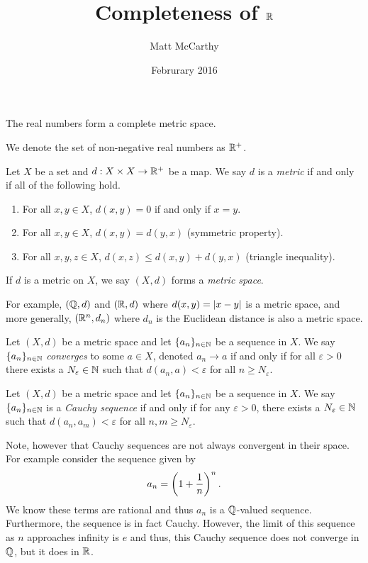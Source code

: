 \documentclass[notitlepage]{simple}
\author{Matt McCarthy}
\title{Completeness of $\mathbb{R}$}
\date{Februrary 2016}
\begin{document}
\maketitle

\begin{thm*}
	The real numbers form a complete metric space.
\end{thm*}

We denote the set of non-negative real numbers as $\mathbb{R}^+$.

\begin{definition}[Metric]
	Let $X$ be a set and $d:X\times X\rightarrow \mathbb{R}^+$ be a map.
	We say $d$ is a \textit{metric} if and only if all of the following hold.
	\begin{enumerate}
		\item For all $x,y\in X$, $d(x,y)=0$ if and only if $x=y$.
		\item For all $x,y\in X$, $d(x,y)=d(y,x)$ (symmetric property).
		\item For all $x,y,z\in X$, $d(x,z)\leq d(x,y)+d(y,x)$ (triangle inequality).
	\end{enumerate}
	If $d$ is a metric on $X$, we say $(X,d)$ forms a \textit{metric space}.
\end{definition}

For example, $(\mathbb{Q},d)$ and $(\mathbb{R},d)$ where $d(x,y)=\left| x-y \right|$ is a metric space,
and more generally, $(\mathbb{R}^n, d_n)$ where $d_n$ is the Euclidean distance is also a metric space.

\begin{definition}
	Let $(X,d)$ be a metric space and let $\lbrace a_n \rbrace_{n\in\mathbb{N}}$ be a sequence in $X$.
	We say $\lbrace a_n \rbrace_{n\in\mathbb{N}}$ \textit{converges} to some $a\in X$, denoted $a_n\rightarrow a$ if and only if for all $\varepsilon>0$ there exists a $N_\varepsilon\in\mathbb{N}$ such that $d(a_n,a)<\varepsilon$ for all $n\geq N_\varepsilon$.
\end{definition}

\begin{definition}
	Let $(X,d)$ be a metric space and let $\lbrace a_n \rbrace_{n\in\mathbb{N}}$ be a sequence in $X$.
	We say $\lbrace a_n \rbrace_{n\in\mathbb{N}}$ is a \textit{Cauchy sequence} if and only if for any $\varepsilon>0$, there exists a $N_\varepsilon\in\mathbb{N}$ such that $d(a_n,a_m)<\varepsilon$ for all $n,m\geq N_\varepsilon$.
\end{definition}

Note, however that Cauchy sequences are not always convergent in their space.
For example consider the sequence given by
\[
	a_n = \left( 1+\frac{1}{n} \right)^n.
\]
We know these terms are rational and thus $a_n$ is a $\mathbb{Q}$-valued sequence.
Furthermore, the sequence is in fact Cauchy.
However, the limit of this sequence as $n$ approaches infinity is $e$ and thus, this Cauchy sequence does not converge in $\mathbb{Q}$, but it does in $\mathbb{R}$.
\end{document}
